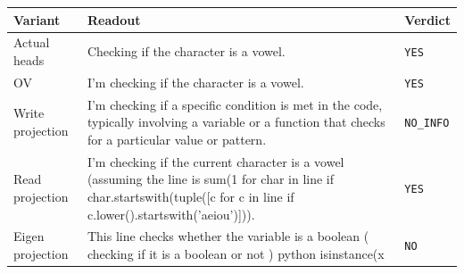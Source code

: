 \begin{tabular}{lp{.64\linewidth}l}\toprule
Variant & Readout & Verdict\\\midrule
Actual heads & Checking if the character is a vowel. & \texttt{YES}\\
OV & I'm checking if the character is a vowel. & \texttt{YES}\\
Write projection & I'm checking if a specific condition is met in the code, typically involving a variable or a function that checks for a particular value or pattern. & \texttt{NO\_INFO}\\
Read projection & I'm checking if the current character is a vowel (assuming the line is \textasciigrave{}sum(1 for char in line if char.startswith(tuple([c for c in line if c.lower().startswith('aeiou')]))\textasciigrave{}. & \texttt{YES}\\
Eigen projection & This line checks whether the variable is a boolean ( checking if it is a boolean or not ) \textasciigrave{}\textasciigrave{}\textasciigrave{}python isinstance(x \textasciigrave{}\textasciigrave{} & \texttt{NO}\\
\bottomrule\end{tabular}